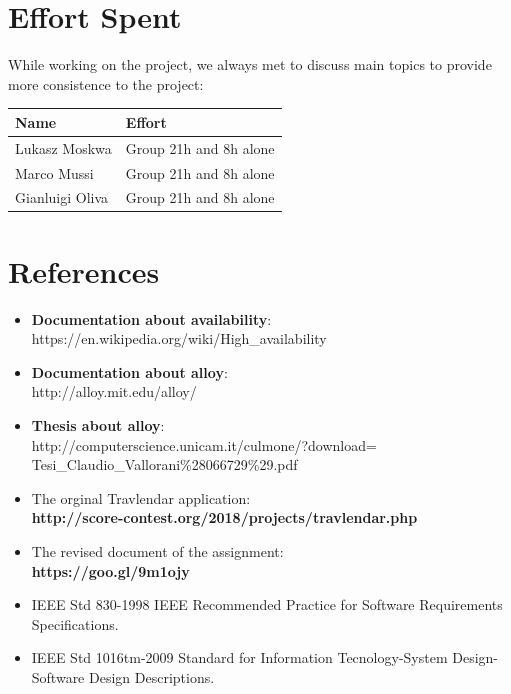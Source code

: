 \documentclass[numbers=noenddot, 12pt, a4paper, oneside]{scrbook}
\begin{document}




\chapter{Effort Spent}

While working on the project, we always met to discuss main topics to provide more consistence to the project:\\

\begin{tabular}{|p{}|p{}|}
	\hline
	\parbox[c][6ex]{6ex}{\centering \textbf{Name}} & \textbf{Effort}
	\\
	\hline
	\parbox[c][8ex]{6ex}{\centering Lukasz Moskwa} & Group 21h and 8h alone\\
	\hline
	\parbox[c][8ex]{6ex}{\centering Marco Mussi} & Group 21h and 8h alone\\
	\hline
	\parbox[c][8ex]{6ex}{\centering Gianluigi Oliva} & Group 21h and 8h alone \\
	\hline
		
	
	
\end{tabular}

\chapter{References}

\begin{itemize}
	\item \textbf{Documentation about availability}:\\ https://en.wikipedia.org/wiki/High\_availability
	\item \textbf{Documentation about alloy}:\\ http://alloy.mit.edu/alloy/
	\item \textbf{Thesis about alloy}:\\ http://computerscience.unicam.it/culmone/?download=\\Tesi\_Claudio\_Vallorani\%28066729\%29.pdf
	\item The orginal Travlendar application: \\
	\textbf{http://score-contest.org/2018/projects/travlendar.php}
	\item The revised document of the assignment:\\
	\textbf{https://goo.gl/9m1ojy}
	\item IEEE Std 830-1998 IEEE Recommended Practice for Software Requirements Specifications. 
	\item IEEE Std 1016tm-2009 Standard for Information Tecnology-System Design-Software Design Descriptions.
\end{itemize}
\end{document}
